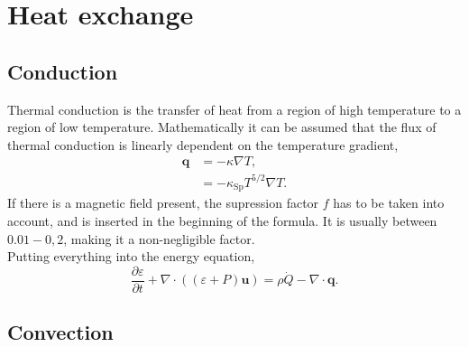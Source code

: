 \section{Heat exchange}
\subsection{Conduction}
Thermal conduction is the transfer of heat from a region of high temperature to a region of low temperature. Mathematically it can be assumed that the flux of thermal conduction is linearly dependent on the temperature gradient, 
\begin{equation}
  \begin{aligned}
    \mathbf{q} &= -\kappa\nabla T,\\
               &= -\kappa_\text{Sp} T^{5/2}\nabla T. 
  \end{aligned}
\end{equation}
If there is a magnetic field present, the \textsf{supression factor $f$} has to be taken into account, and is inserted in the beginning of the formula. It is usually between $0.01-0,2$, making it a non-negligible factor.\\
Putting everything into the energy equation,
\begin{equation}
  \frac{\partial \varepsilon}{\partial t} + \nabla\cdot((\varepsilon + P)\mathbf{u}) = \rho \dot Q - \nabla\cdot\mathbf{q}. 
\end{equation}

\subsection{Convection}
